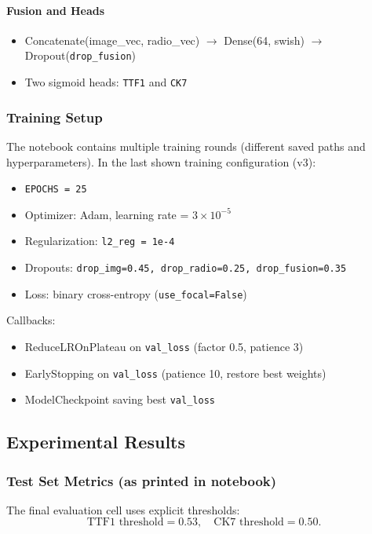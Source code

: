 \paragraph{Fusion and Heads}
\begin{itemize}
    \item Concatenate(image\_vec, radio\_vec) $\rightarrow$ Dense(64, swish) $\rightarrow$ Dropout(\texttt{drop\_fusion})
    \item Two sigmoid heads: \texttt{TTF1} and \texttt{CK7}
\end{itemize}

\subsubsection{Training Setup}
The notebook contains multiple training rounds (different saved paths and hyperparameters). In the last shown training configuration (v3):
\begin{itemize}
    \item \texttt{EPOCHS = 25}
    \item Optimizer: Adam, learning rate = $3 \times 10^{-5}$
    \item Regularization: \texttt{l2\_reg = 1e-4}
    \item Dropouts: \texttt{drop\_img=0.45, drop\_radio=0.25, drop\_fusion=0.35}
    \item Loss: binary cross-entropy (\texttt{use\_focal=False})
\end{itemize}

Callbacks:
\begin{itemize}
    \item ReduceLROnPlateau on \texttt{val\_loss} (factor 0.5, patience 3)
    \item EarlyStopping on \texttt{val\_loss} (patience 10, restore best weights)
    \item ModelCheckpoint saving best \texttt{val\_loss}
\end{itemize}

\subsection{Experimental Results}

\subsubsection{Test Set Metrics (as printed in notebook)}
The final evaluation cell uses explicit thresholds:
\[
\text{TTF1 threshold}=0.53, \quad \text{CK7 threshold}=0.50.
\]

